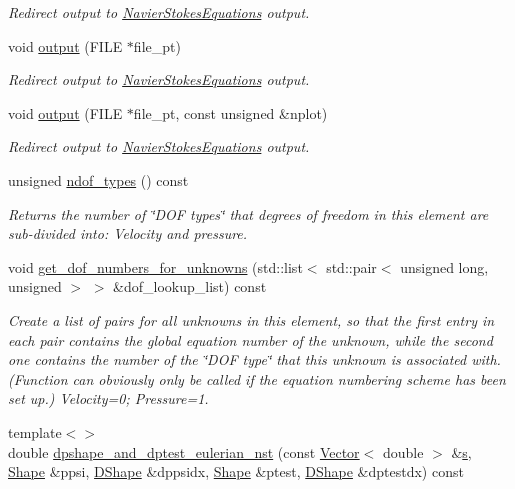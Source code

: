 \begin{DoxyCompactItemize}
\begin{DoxyCompactList}\small\item\em Redirect output to \hyperlink{classoomph_1_1NavierStokesEquations}{Navier\+Stokes\+Equations} output. \end{DoxyCompactList}\item 
void \hyperlink{classoomph_1_1QTaylorHoodElement_a75af9559b2b53886f8f256a08c315a45}{output} (F\+I\+LE $\ast$file\+\_\+pt)
\begin{DoxyCompactList}\small\item\em Redirect output to \hyperlink{classoomph_1_1NavierStokesEquations}{Navier\+Stokes\+Equations} output. \end{DoxyCompactList}\item 
void \hyperlink{classoomph_1_1QTaylorHoodElement_a0544106fc73db26d59619f6303b5803c}{output} (F\+I\+LE $\ast$file\+\_\+pt, const unsigned \&nplot)
\begin{DoxyCompactList}\small\item\em Redirect output to \hyperlink{classoomph_1_1NavierStokesEquations}{Navier\+Stokes\+Equations} output. \end{DoxyCompactList}\item 
unsigned \hyperlink{classoomph_1_1QTaylorHoodElement_a14a90f0ce2b19d79ed9bc9b755e0b2d2}{ndof\+\_\+types} () const
\begin{DoxyCompactList}\small\item\em Returns the number of \char`\"{}\+D\+O\+F types\char`\"{} that degrees of freedom in this element are sub-\/divided into\+: Velocity and pressure. \end{DoxyCompactList}\item 
void \hyperlink{classoomph_1_1QTaylorHoodElement_abe161055c22b04059a4a4e71cd2681f0}{get\+\_\+dof\+\_\+numbers\+\_\+for\+\_\+unknowns} (std\+::list$<$ std\+::pair$<$ unsigned long, unsigned $>$ $>$ \&dof\+\_\+lookup\+\_\+list) const
\begin{DoxyCompactList}\small\item\em Create a list of pairs for all unknowns in this element, so that the first entry in each pair contains the global equation number of the unknown, while the second one contains the number of the \char`\"{}\+D\+O\+F type\char`\"{} that this unknown is associated with. (Function can obviously only be called if the equation numbering scheme has been set up.) Velocity=0; Pressure=1. \end{DoxyCompactList}\item 
{\footnotesize template$<$$>$ }\\double \hyperlink{classoomph_1_1QTaylorHoodElement_a91faff3077dd80f893d58f93f5f1eb2e}{dpshape\+\_\+and\+\_\+dptest\+\_\+eulerian\+\_\+nst} (const \hyperlink{classoomph_1_1Vector}{Vector}$<$ double $>$ \&\hyperlink{cfortran_8h_ab7123126e4885ef647dd9c6e3807a21c}{s}, \hyperlink{classoomph_1_1Shape}{Shape} \&ppsi, \hyperlink{classoomph_1_1DShape}{D\+Shape} \&dppsidx, \hyperlink{classoomph_1_1Shape}{Shape} \&ptest, \hyperlink{classoomph_1_1DShape}{D\+Shape} \&dptestdx) const

\end{DoxyCompactItemize}
